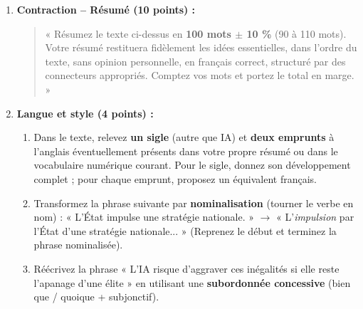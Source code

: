 \documentclass[11pt]{article}
\begin{document}
\begin{exercice}
\begin{enumerate}
\item \textbf{Contraction -- Résumé (10 points) :}
\begin{quote}
« Résumez le texte ci-dessus en \textbf{100 mots $\pm$ 10 \%} (90 à 110 mots). Votre résumé restituera fidèlement les idées essentielles, dans l'ordre du texte, sans opinion personnelle, en français correct, structuré par des connecteurs appropriés. Comptez vos mots et portez le total en marge. »
\end{quote}

\item \textbf{Langue et style (4 points) :}
\begin{enumerate}
\item Dans le texte, relevez \textbf{un sigle} (autre que IA) et \textbf{deux emprunts} à l'anglais éventuellement présents dans votre propre résumé ou dans le vocabulaire numérique courant. Pour le sigle, donnez son développement complet ; pour chaque emprunt, proposez un équivalent français.
\item Transformez la phrase suivante par \textbf{nominalisation} (tourner le verbe en nom) : « L'État impulse une stratégie nationale. » $\to$ « L'\emph{impulsion} par l'État d'une stratégie nationale... » (Reprenez le début et terminez la phrase nominalisée).
\item Réécrivez la phrase « L'IA risque d'aggraver ces inégalités si elle reste l'apanage d'une élite » en utilisant une \textbf{subordonnée concessive} (bien que / quoique + subjonctif).
\end{enumerate}
\end{enumerate}
\end{exercice}
\end{document}
